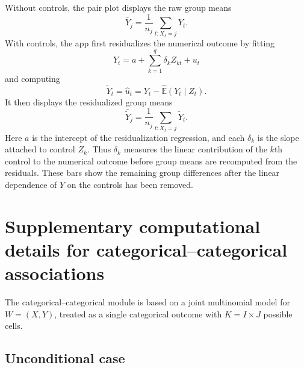 \documentclass[11pt]{article}
\begin{document}
\begin{appendix}
Without controls, the pair plot displays the raw group means
\begin{equation}
\bar{Y}_j = \frac{1}{n_j}\sum_{t:X_t=j} Y_t.
\label{eq:app-group-means}
\end{equation}
With controls, the app first residualizes the numerical outcome by fitting
\begin{equation}
Y_t = a + \sum_{k=1}^{q} \delta_k Z_{kt} + u_t
\label{eq:app-y-on-z}
\end{equation}
and computing
\begin{equation}
\tilde{Y}_t = \hat{u}_t = Y_t - \widehat{\mathbb{E}}(Y_t \mid Z_t).
\label{eq:app-y-resid}
\end{equation}
It then displays the residualized group means
\begin{equation}
\bar{\tilde{Y}}_j
=
\frac{1}{n_j}\sum_{t:X_t=j}\tilde{Y}_t.
\label{eq:app-resid-means}
\end{equation}
Here $a$ is the intercept of the residualization regression, and each
$\delta_k$ is the slope attached to control $Z_k$. Thus $\delta_k$ measures the
linear contribution of the $k$th control to the numerical outcome before group
means are recomputed from the residuals.
These bars show the remaining group differences after the linear dependence of
$Y$ on the controls has been removed.

\section{Supplementary computational details for categorical--categorical associations}
\label{app:catcat}

The categorical--categorical module is based on a joint multinomial model for
$W = (X, Y)$, treated as a single categorical outcome with
$K = I \times J$ possible cells.

\subsection{Unconditional case}


\end{appendix}
\end{document}
